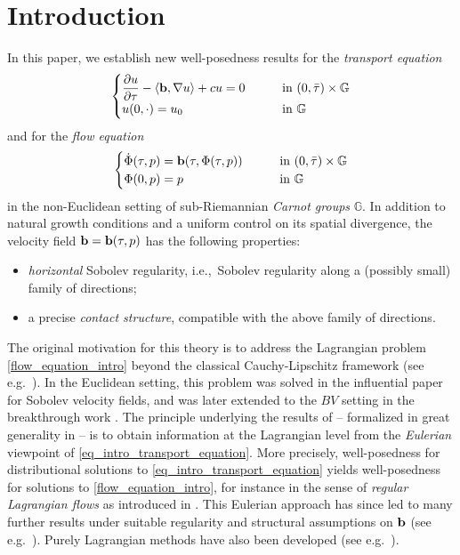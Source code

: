 \documentclass[11pt]{amsart}
\newcommand{\bb}{{\bf {b}}} %
\theoremstyle{plain}
\theoremstyle{definition}
\theoremstyle{remark}
\numberwithin{equation}{section}
\begin{document}
\section{Introduction}
In this paper, we establish new well-posedness results for the \emph{transport equation}
\begin{equation} \label{eq_intro_transport_equation}
\begin{cases}
\displaystyle{\frac{\partial u}{\partial \tau} - \left\langle \bb,\nabla u \right\rangle + cu = 0} & \qquad\text{in $(0,\bar{\tau}) \times \mathbb{G}$}\\
u(0,\cdot)=u_0 & \qquad\text{in $\mathbb{G}$}
\end{cases}
\end{equation}
and for the \emph{flow equation}
\begin{equation}
\label{flow_equation_intro}
\begin{cases}
\displaystyle{\Dot\Phi(\tau,p) =\bb(\tau,\Phi(\tau,p))} & \qquad\text{in $(0,\bar{\tau}) \times \mathbb{G}$}\\
\Phi(0,p)=p & \qquad\text{in $\mathbb{G}$}
\end{cases}
\end{equation}
in the non-Euclidean setting of sub-Riemannian \emph{Carnot groups} $\mathbb G$. In addition to natural growth conditions and a uniform control on its spatial divergence, the velocity field $\bb=\bb(\tau,p)$ has the following properties:
\begin{itemize}
    \item [(i)] \emph{horizontal} Sobolev regularity, i.e.,~Sobolev regularity along a (possibly small) family of directions;
    \item [(ii)] a precise \emph{contact structure}, compatible with the above family of directions.
\end{itemize} 
The original motivation for this theory is to address the Lagrangian problem \eqref{flow_equation_intro} beyond the classical Cauchy-Lipschitz framework (see e.g.~\cite[Chapter 8]{MR2401600}). In the Euclidean setting, this problem was solved in the influential paper \cite{MR1022305} for Sobolev velocity fields, and was later extended to the $BV$ setting in the breakthrough work \cite{MR2096794}. The principle underlying the results of \cite{MR2096794,MR1022305} -- formalized in great generality in \cite{MR2409676,MR3283066} -- is to obtain information at the Lagrangian level from the \emph{Eulerian} viewpoint of \eqref{eq_intro_transport_equation}. More precisely, well-posedness for distributional solutions to  \eqref{eq_intro_transport_equation} yields well-posedness for solutions to \eqref{flow_equation_intro}, for instance in the sense of \emph{regular Lagrangian flows} as introduced in \cite{MR2096794}. 
This Eulerian approach has since led to many further results under suitable regularity and structural assumptions on $\bb$ (see e.g.~\cite{MR4071413,MR1411988,MR2044334,MR2124585}). Purely Lagrangian methods have also been developed (see e.g.~\cite{MR2369485,MR2737390,MR4242824}).
\end{document}
